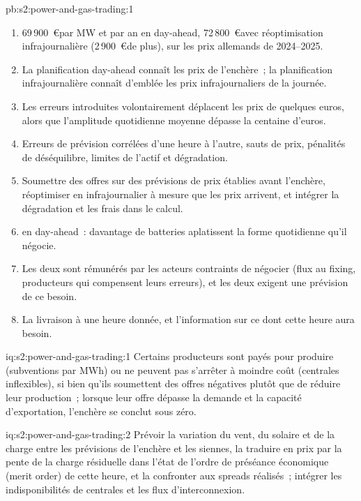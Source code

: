 \begin{solution}{pb:s2:power-and-gas-trading:1}
\begin{enumerate}
4\,900~\euro.
\item 69\,900~\euro par MW et par an en day-ahead, 72\,800~\euro avec réoptimisation infrajournalière (2\,900~\euro de plus), sur les prix allemands de 2024--2025.
\item La planification day-ahead connaît les prix de l'enchère~; la planification infrajournalière connaît d'emblée les prix infrajournaliers de la journée.
\item Les erreurs introduites volontairement déplacent les prix de quelques euros, alors que l'amplitude quotidienne moyenne dépasse la centaine d'euros.
\item Erreurs de prévision corrélées d'une heure à l'autre, sauts de prix, pénalités de déséquilibre, limites de l'actif et dégradation.
\item Soumettre des offres sur des prévisions de prix établies avant l'enchère, réoptimiser en infrajournalier à mesure que les prix arrivent, et intégrer la dégradation et les frais dans le calcul.
\item {} en day-ahead~: davantage de batteries aplatissent la forme quotidienne qu'il négocie.
\item Les deux sont rémunérés par les acteurs contraints de négocier (flux au fixing, producteurs qui compensent leurs erreurs), et les deux exigent une prévision de ce besoin.
\item La livraison à une heure donnée, et l'information sur ce dont cette heure aura besoin.
\end{enumerate}
\end{solution}

\begin{solution}{iq:s2:power-and-gas-trading:1}
Certains producteurs sont payés pour produire (subventions par MWh) ou ne peuvent pas s'arrêter à moindre coût (centrales inflexibles), si bien qu'ils soumettent des offres négatives plutôt que de réduire leur production~; lorsque
leur offre dépasse la demande et la capacité d'exportation, l'enchère se conclut sous zéro.
\end{solution}

\begin{solution}{iq:s2:power-and-gas-trading:2}
Prévoir la variation du vent, du solaire et de la charge entre les prévisions de l'enchère et les siennes, la traduire en prix par la pente de la charge résiduelle dans
l'état de l'ordre de préséance économique (merit order) de cette heure, et la confronter aux spreads réalisés~; intégrer les indisponibilités de centrales et les flux d'interconnexion.
\end{solution}


